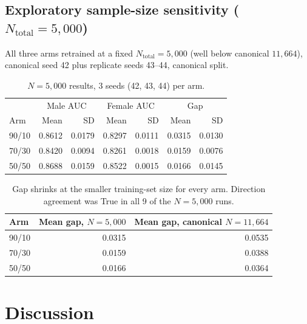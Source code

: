 \documentclass[11pt]{article}
\begin{document}
\subsection{Exploratory sample-size sensitivity ($N_{\text{total}}=5{,}000$)}

All three arms retrained at a fixed $N_{\text{total}}=5{,}000$ (well below canonical $11{,}664$), canonical seed 42 plus replicate seeds 43--44, canonical split.

\begin{table}[H]
\centering
\begin{tabular}{lrrrrrr}
\toprule
& \multicolumn{2}{c}{Male AUC} & \multicolumn{2}{c}{Female AUC} & \multicolumn{2}{c}{Gap} \\
Arm & Mean & SD & Mean & SD & Mean & SD \\
\midrule
90/10 & 0.8612 & 0.0179 & 0.8297 & 0.0111 & 0.0315 & 0.0130 \\
70/30 & 0.8420 & 0.0094 & 0.8261 & 0.0018 & 0.0159 & 0.0076 \\
50/50 & 0.8688 & 0.0159 & 0.8522 & 0.0015 & 0.0166 & 0.0145 \\
\bottomrule
\end{tabular}
\caption{$N=5{,}000$ results, 3 seeds (42, 43, 44) per arm.}
\label{tab:nsens}
\end{table}

\begin{table}[H]
\centering
\begin{tabular}{lrr}
\toprule
Arm & Mean gap, $N=5{,}000$ & Mean gap, canonical $N=11{,}664$ \\
\midrule
90/10 & 0.0315 & 0.0535 \\
70/30 & 0.0159 & 0.0388 \\
50/50 & 0.0166 & 0.0364 \\
\bottomrule
\end{tabular}
\caption{Gap shrinks at the smaller training-set size for every arm. Direction agreement was True in all 9 of the $N=5{,}000$ runs.}
\label{tab:nsens_compare}
\end{table}

\section{Discussion}
\end{document}
